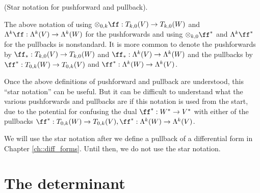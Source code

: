 \begin{remark}
\label{ch::exterior_pwrs::rmk::star_notation_pushforward_pullback}
    (Star notation for pushforward and pullback).
    
    The above notation of using $\otimes_{0, k} \ff:T_{k,0}(V) \rightarrow T_{k,0}(W)$ and $\Lambda^k \ff:\Lambda^k(V) \rightarrow \Lambda^k(W)$ for the pushforwards and using $\otimes_{k, 0} \ff^*$ and $\Lambda^k \ff^*$ for the pullbacks is nonstandard. It is more common to denote the pushforwards by ${\ff_*:T_{k,0}(V) \rightarrow T_{k,0}(W)}$ and ${\ff_*:\Lambda^k(V) \rightarrow \Lambda^k(W)}$ and the pullbacks by ${\ff^*:T_{0,k}(W) \rightarrow T_{0,k}(V)}$ and ${\ff^*:\Lambda^k(W) \rightarrow \Lambda^k(V)}$.
    
    Once the above definitions of pushforward and pullback are understood, this ``star notation'' can be useful. But it can be difficult to understand what the various pushforwards and pullbacks are if this notation is used from the start, due to the potential for confusing the dual $\ff^*:W^* \rightarrow V^*$ with either of the pullbacks ${\ff^*:T_{0,k}(W) \rightarrow T_{0,k}(V)}, {\ff^*:\Lambda^k(W) \rightarrow \Lambda^k(V)}$.
    
    We will use the star notation after we define a pullback of a differential form in Chapter \ref{ch::diff_forms}. Until then, we do not use the star notation.
\end{remark}

\newpage

\section{The determinant}

\label{ch::exterior_pwrs::determinant}

